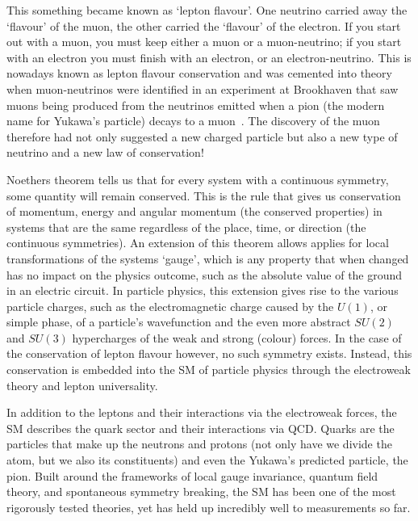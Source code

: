 This something became known as 	`lepton flavour'.  
One neutrino carried away the `flavour' of the muon, the other carried the `flavour' of the electron.
If you start out with a muon, you must keep either a muon or a muon-neutrino; if you start with an electron you must finish with an electron, or an electron-neutrino.
This is nowadays known as lepton flavour conservation and was cemented into theory when muon-neutrinos were identified in an experiment at Brookhaven that saw muons being produced from the neutrinos emitted when
a pion (the modern name for Yukawa's particle) decays to a muon~\cite{MuNeutrinoDiscovery}.
The discovery of the muon therefore had not only suggested a new charged particle but also a new type of neutrino and a new law of conservation!

Noethers theorem tells us that for every system with a continuous symmetry, some quantity will remain conserved.
This is the rule that gives us conservation of momentum, energy and angular momentum (the conserved properties) in systems that are the same regardless of the place, time, or direction (the continuous symmetries).
An extension of this theorem allows applies for local transformations of the systems `gauge', which is any property that when changed has no impact on the physics outcome, such as the absolute value of the ground in an electric circuit.
In particle physics, this extension gives rise to the various particle charges, such as the electromagnetic charge caused by the $U(1)$, or simple phase, of a particle's wavefunction and the even more abstract $SU(2)$ and $SU(3)$ hypercharges of the weak and strong (colour) forces.
In the case of the conservation of lepton flavour however, no such symmetry exists.
Instead, this conservation is embedded into the \ac{SM} of particle physics through the electroweak theory and lepton universality.

In addition to the leptons and their interactions via the electroweak forces, the \ac{SM} describes the quark sector and their interactions via \ac{QCD}.
Quarks are the particles that make up the neutrons and protons (not only have we divide the atom, but we also its constituents) and even the Yukawa's predicted particle, the pion.
Built around the frameworks of local gauge invariance, quantum field theory, and spontaneous symmetry breaking, the \ac{SM} has been one of the most rigorously tested theories, yet has held up incredibly well to measurements so far.

